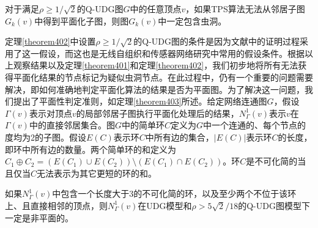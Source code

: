 \begin{theorem}
  \label{theorem402}
对于满足$\rho\ge1/\sqrt{2}$的Q-UDG图$G$中的任意顶点$v$，如果TPS算法无法从邻居子图$G_k(v)$中得到平面化子图，则图$G_k(v)$中一定包含虫洞。
\end{theorem}

定理\ref{theorem402}中设置$\rho\ge1/\sqrt{2}$的Q-UDG图的条件是因为文献中的证明过程采用了这一假设，而这也是无线自组织和传感器网络研究中常用的假设条件。根据以上观察结果以及定理\ref{theorem401}和定理\ref{theorem402}，我们初步地将所有无法获得平面化结果的节点标记为疑似虫洞节点。在此过程中，仍有一个重要的问题需要解决，即如何准确地判定平面化算法的结果是否为平面图。为了解决这一问题，我们提出了平面性判定准则，如定理\ref{theorem403}所述。给定网络连通图$G$，假设$\Gamma(v)$表示对顶点$v$的局部邻居子图执行平面化处理后的结果，$N_{\Gamma}^1(v)$表示$v$在$\Gamma(v)$中的直接邻居集合。图$G$中的简单环$C$定义为$G$中一个连通的、每个节点的度均为2的子图。假设$E(C)$表示环$C$中所有边的集合，$|E(C)|$表示环$C$的长度，即环中所有边的数量。两个简单环的和定义为$C_1\oplus{C_2}=(E(C_1)\cup{E(C_2)})\setminus(E(C_1)\cap{E(C_2)})$。环$C$是不可化简的当且仅当$C$无法表示为其它更短的环的和。
\begin{theorem}
  \label{theorem403}
如果$N_{\Gamma}^1(v)$中包含一个长度大于3的不可化简的环，以及至少两个不位于该环上、且直接相邻的顶点，则$N_{\Gamma}^1(v)$在UDG模型和$\rho>5\sqrt{2}/18$的Q-UDG图模型下一定是非平面的。
\end{theorem}
